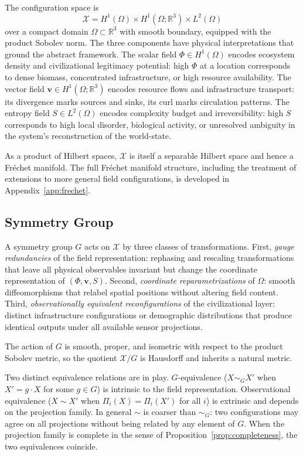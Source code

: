 \documentclass[12pt, oneside]{article}
\begin{document}
The configuration space is
\[
\mathcal{X} = H^1(\Omega) \times H^1(\Omega;\mathbb{R}^3) \times L^2(\Omega)
\]
over a compact domain $\Omega \subset \mathbb{R}^3$ with smooth boundary, equipped with
the product Sobolev norm. The three components have physical interpretations that ground
the abstract framework. The scalar field $\Phi \in H^1(\Omega)$ encodes ecosystem density
and civilizational legitimacy potential: high $\Phi$ at a location corresponds to dense
biomass, concentrated infrastructure, or high resource availability. The vector field
$\mathbf{v} \in H^1(\Omega;\mathbb{R}^3)$ encodes resource flows and infrastructure
transport: its divergence marks sources and sinks, its curl marks circulation patterns.
The entropy field $S \in L^2(\Omega)$ encodes complexity budget and irreversibility: high
$S$ corresponds to high local disorder, biological activity, or unresolved ambiguity in
the system's reconstruction of the world-state.

As a product of Hilbert spaces, $\mathcal{X}$ is itself a separable Hilbert space and
hence a Fréchet manifold. The full Fréchet manifold structure, including the treatment of
extensions to more general field configurations, is developed in
Appendix~\ref{app:frechet}.

\subsection{Symmetry Group}

A symmetry group $G$ acts on $\mathcal{X}$ by three classes of transformations. First,
\emph{gauge redundancies} of the field representation: rephasing and rescaling
transformations that leave all physical observables invariant but change the coordinate
representation of $(\Phi, \mathbf{v}, S)$. Second, \emph{coordinate reparametrizations}
of $\Omega$: smooth diffeomorphisms that relabel spatial positions without altering field
content. Third, \emph{observationally equivalent reconfigurations} of the civilizational
layer: distinct infrastructure configurations or demographic distributions that produce
identical outputs under all available sensor projections.

The action of $G$ is smooth, proper, and isometric with respect to the product Sobolev
metric, so the quotient $\mathcal{X}/G$ is Hausdorff and inherits a natural metric.

Two distinct equivalence relations are in play. $G$-equivalence ($X \sim_G X'$ when
$X' = g \cdot X$ for some $g \in G$) is intrinsic to the field representation.
Observational equivalence ($X \sim X'$ when $\Pi_i(X) = \Pi_i(X')$ for all $i$) is
extrinsic and depends on the projection family. In general $\sim$ is coarser than
$\sim_G$: two configurations may agree on all projections without being related by any
element of $G$. When the projection family is complete in the sense of
Proposition~\ref{prop:completeness}, the two equivalences coincide.
\end{document}
